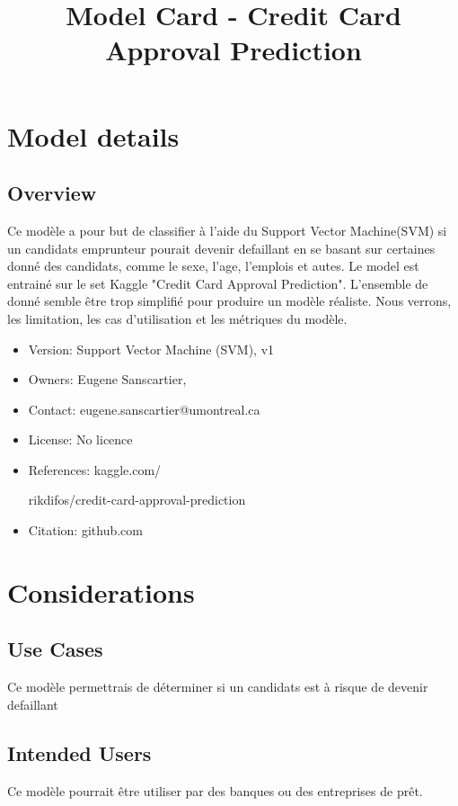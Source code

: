 \documentclass[8pt]{article}
\title{Model Card - Credit Card Approval Prediction}
\date{\vspace{-10ex}}
\begin{document}
\fontsize{40}{48}
\twocolumn

\normalsize%
\maketitle%
\section*{Model details}
\subsection*{Overview}
Ce modèle a pour but de classifier à l'aide du Support Vector Machine(SVM) si un candidats emprunteur pourait devenir defaillant en se basant sur certaines donné des candidats, comme le sexe, l'age, l'emplois et autes. Le model est entrainé sur le set Kaggle "Credit Card Approval Prediction". L'ensemble de donné semble être trop simplifié pour produire un modèle réaliste. Nous verrons, les limitation, les cas d'utilisation et les métriques du modèle.

\begin{itemize}
  \item Version: Support Vector Machine (SVM), v1
  \item Owners: Eugene Sanscartier, 
  \item Contact: eugene.sanscartier@umontreal.ca
  \item License: No licence
  \item References: kaggle.com/

rikdifos/credit-card-approval-prediction
  \item Citation: github.com
\end{itemize}


\section*{Considerations}
\subsection*{Use Cases}
Ce modèle permettrais de déterminer si un candidats est à risque  de devenir defaillant

\subsection*{Intended Users}
Ce modèle pourrait être utiliser par des banques ou des entreprises de prêt.
\end{document}
